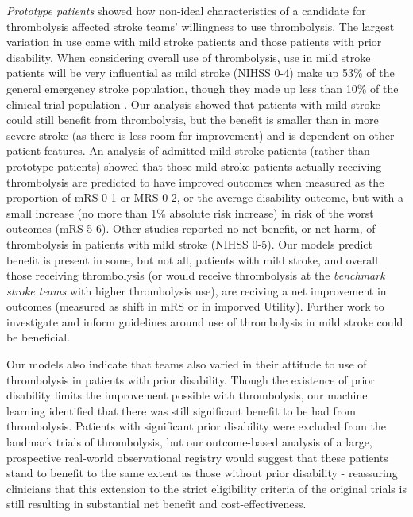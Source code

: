 \textit{Prototype patients} showed how non-ideal characteristics of a candidate for thrombolysis affected stroke teams' willingness to use thrombolysis. The largest variation in use came with mild stroke patients and those patients with prior disability. When considering overall use of thrombolysis, use in mild stroke patients will be very influential as mild stroke (NIHSS 0-4) make up 53\% of the general emergency stroke population, though they made up less than 10\% of the clinical trial population \cite{emberson_effect_2014}. Our analysis showed that patients with mild stroke could still benefit from thrombolysis, but the benefit is smaller than in more severe stroke (as there is less room for improvement) and is dependent on other patient features. An analysis of admitted mild stroke patients (rather than prototype patients) showed that those mild stroke patients actually receiving thrombolysis are predicted to have improved outcomes when measured as the proportion of mRS 0-1 or MRS 0-2, or the average disability outcome, but with a small increase (no more than 1\% absolute risk increase) in risk of the worst outcomes (mRS 5-6). Other studies \cite{romano_predictors_2021, coutts_tenecteplase_2024} reported no net benefit, or net harm, of thrombolysis in patients with mild stroke (NIHSS 0-5). Our models predict benefit is present in some, but not all, patients with mild stroke, and overall those receiving thrombolysis (or would receive thrombolysis at the \textit{benchmark stroke teams} with higher thrombolysis use), are reciving a net improvement in outcomes (measured as shift in mRS or in imporved Utility).  Further work to investigate and inform guidelines around use of thrombolysis in mild stroke could be beneficial.

Our models also indicate that teams also varied in their attitude to use of thrombolysis in patients with prior disability. Though the existence of prior disability limits the improvement possible with thrombolysis, our machine learning identified that there was still significant benefit to be had from thrombolysis. Patients with significant prior disability were excluded from the landmark trials of thrombolysis, but our outcome-based analysis of a large, prospective real-world observational registry would suggest that these patients stand to benefit to the same extent as those without prior disability - reassuring clinicians that this extension to the strict eligibility criteria of the original trials is still resulting in substantial net benefit and cost-effectiveness. 


